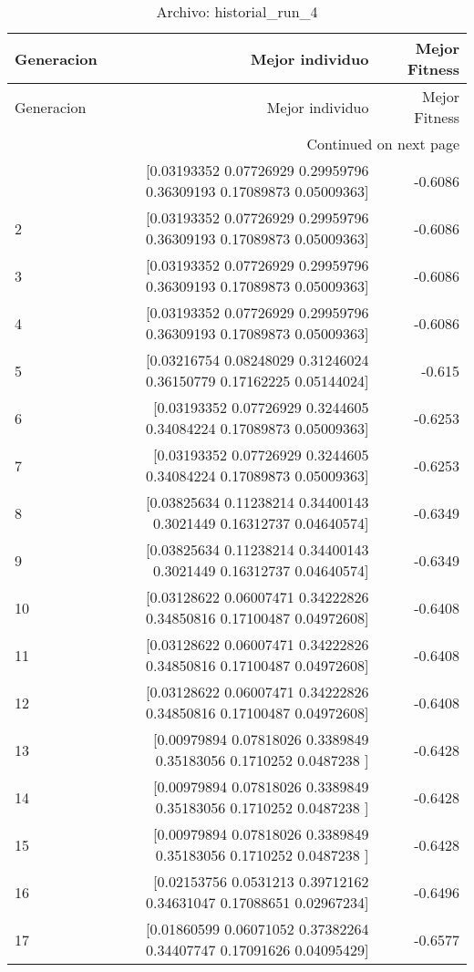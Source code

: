 \begin{longtable}{lrr}
\caption{Archivo: historial\_run\_4}\label{tab:historial_run_4} \\
\toprule
Generacion & Mejor individuo & Mejor Fitness \\
\midrule
\endfirsthead
\toprule
Generacion & Mejor individuo & Mejor Fitness \\
\midrule
\endhead
\midrule
\multicolumn{3}{r}{Continued on next page} \\
\midrule
\endfoot
\bottomrule
\endlastfoot
1 & [0.03193352 0.07726929 0.29959796 0.36309193 0.17089873 0.05009363] & -0.6086 \\
2 & [0.03193352 0.07726929 0.29959796 0.36309193 0.17089873 0.05009363] & -0.6086 \\
3 & [0.03193352 0.07726929 0.29959796 0.36309193 0.17089873 0.05009363] & -0.6086 \\
4 & [0.03193352 0.07726929 0.29959796 0.36309193 0.17089873 0.05009363] & -0.6086 \\
5 & [0.03216754 0.08248029 0.31246024 0.36150779 0.17162225 0.05144024] & -0.615 \\
6 & [0.03193352 0.07726929 0.3244605  0.34084224 0.17089873 0.05009363] & -0.6253 \\
7 & [0.03193352 0.07726929 0.3244605  0.34084224 0.17089873 0.05009363] & -0.6253 \\
8 & [0.03825634 0.11238214 0.34400143 0.3021449  0.16312737 0.04640574] & -0.6349 \\
9 & [0.03825634 0.11238214 0.34400143 0.3021449  0.16312737 0.04640574] & -0.6349 \\
10 & [0.03128622 0.06007471 0.34222826 0.34850816 0.17100487 0.04972608] & -0.6408 \\
11 & [0.03128622 0.06007471 0.34222826 0.34850816 0.17100487 0.04972608] & -0.6408 \\
12 & [0.03128622 0.06007471 0.34222826 0.34850816 0.17100487 0.04972608] & -0.6408 \\
13 & [0.00979894 0.07818026 0.3389849  0.35183056 0.1710252  0.0487238 ] & -0.6428 \\
14 & [0.00979894 0.07818026 0.3389849  0.35183056 0.1710252  0.0487238 ] & -0.6428 \\
15 & [0.00979894 0.07818026 0.3389849  0.35183056 0.1710252  0.0487238 ] & -0.6428 \\
16 & [0.02153756 0.0531213  0.39712162 0.34631047 0.17088651 0.02967234] & -0.6496 \\
17 & [0.01860599 0.06071052 0.37382264 0.34407747 0.17091626 0.04095429] & -0.6577 \\

\end{longtable}
